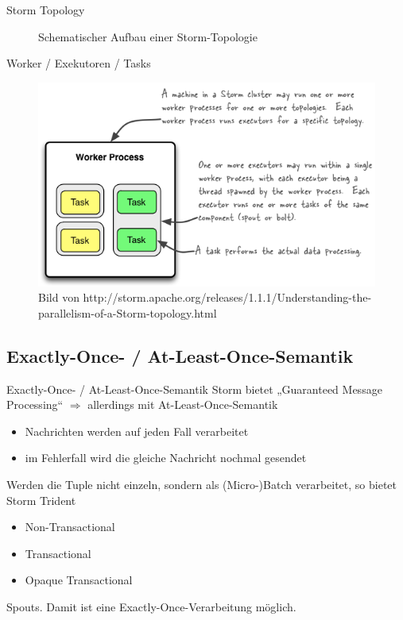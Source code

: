 \documentclass{beamer}
\begin{document}
\begin{frame}[t]{Storm Topology}
  \begin{figure}[h]
    \center
    \scalebox{.7}{}
    \caption{Schematischer Aufbau einer Storm-Topologie}
    \label{fig:topology}
  \end{figure}
\end{frame}

\begin{frame}[t]{Worker / Exekutoren / Tasks}
  \begin{figure}
    \centering
    \includegraphics[scale=0.8,natwidth=563,natheight=341]{img/relationships-worker-processes-executors-tasks.png}
    \caption{ Bild von http://storm.apache.org/releases/1.1.1/Understanding-the-parallelism-of-a-Storm-topology.html}
  \end{figure}
\end{frame}


\subsection{Exactly-Once- / At-Least-Once-Semantik}
\begin{frame}[t]{Exactly-Once- / At-Least-Once-Semantik}
  Storm bietet „Guaranteed Message Processing“ $\Rightarrow$ allerdings mit
  At-Least-Once-Semantik
  \begin{itemize}
    \item Nachrichten werden auf jeden Fall verarbeitet
    \item im Fehlerfall wird die gleiche Nachricht nochmal gesendet
  \end{itemize}
  \pause
  Werden die Tuple nicht einzeln, sondern als (Micro-)Batch verarbeitet, so bietet Storm Trident
  \begin{itemize}
    \item Non-Transactional
    \item Transactional
    \item Opaque Transactional
  \end{itemize}
  Spouts. Damit ist eine Exactly-Once-Verarbeitung möglich.
\end{frame}
\end{document}
